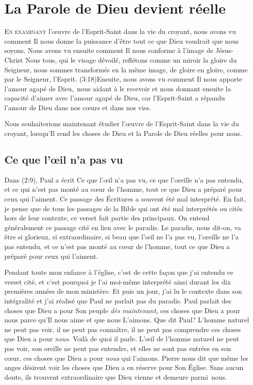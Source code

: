 \chapter{La Parole de Dieu devient r\'eelle}

\lettrine{E}{n examinant} l'\oe{}uvre
 de l'Esprit-Saint dans la vie du croyant,
 nous avons vu comment Il nous donne la puissance
 d'être tout ce que Dieu voudrait que nous soyons.
 Nous avons vu ensuite comment Il nous conforme à l'image de Jésus-Christ\frcolon{}
 \Og Nous tous, qui le visage dévoilé, reflétons comme un miroir la gloire
 du Seigneur, nous sommes transformés en la même image, de gloire en gloire,
 comme par le Seigneur, l'Esprit. \Fg{}
 (3:18)Ensuite, nous avons vu comment
 Il nous apporte l'amour agapé de Dieu,~nous aidant à le recevoir
 et nous donnant ensuite la capacité d'aimer
 avec l'amour agapé de Dieu, car l'Esprit-Saint a répandu l'amour de Dieu
 dans nos cœurs et dans nos vies.

Nous souhaiterions maintenant étudier l'œuvre de l'Esprit-Saint dans la vie
 du croyant, lorsqu'Il rend les choses de Dieu et la Parole de Dieu
 réelles pour nous.


\section{Ce que l'\oe{}il n'a pas vu}

Dans (2:9), Paul a écrit\frcolon{}
 \Og Ce que l'œil n'a pas vu, ce que l'oreille n'a pas entendu,
 et ce qui n'est pas monté au cœur de l'homme, tout ce que Dieu
 a préparé pour ceux qui l'aiment. \Fg{}
 Ce passage des Écritures a souvent été mal interprété. En fait,
 je pense que de tous les passages de la Bible qui ont été mal interprétés
 ou cités hors de leur contexte, ce verset fait partie des principaux.
 On entend généralement ce passage cité en lien avec le paradis.
 Le paradis, nous dit-on, va être si glorieux, si extraordinaire,
 si beau que \Og l'œil ne l'a pas vu, l'oreille ne l'a pas entendu,
 et ce n'est pas monté au cœur de l'homme, tout ce que Dieu a préparé
 pour ceux qui l'aiment. \Fg{}
 \nowidow[4]

Pendant toute mon enfance à l'église, c'est de cette façon que j'ai entendu
 ce verset cité, et c'est pourquoi je l'ai moi-même interprété ainsi
 durant les dix premières années de mon ministère.
 Et puis un jour, j'ai lu le contexte dans son intégralité et j'ai réalisé
 que Paul ne parlait pas du paradis. Paul parlait des choses que Dieu
 a pour Son peuple \emph{dès maintenant},
 ces choses que Dieu a pour nous parce qu'Il
 nous aime et que nous L'aimons. Que dit Paul?
 L'homme naturel ne peut pas voir, il ne peut pas connaître,
 il ne peut pas comprendre ces choses que Dieu a pour \emph{nous}.
 Voilà de quoi il parle. L'œil de l'homme naturel ne peut pas voir,
 son oreille ne peut pas entendre, et elles ne sont pas entrées en son c\oe{}ur, ces choses que Dieu a pour \emph{nous} qui l'aimons.
 Pierre nous dit que même les anges désirent voir les choses que Dieu
 a en réserve pour Son Église.
 Sans aucun doute, ils trouvent extraordinaire que Dieu vienne
 et demeure parmi~nous.


